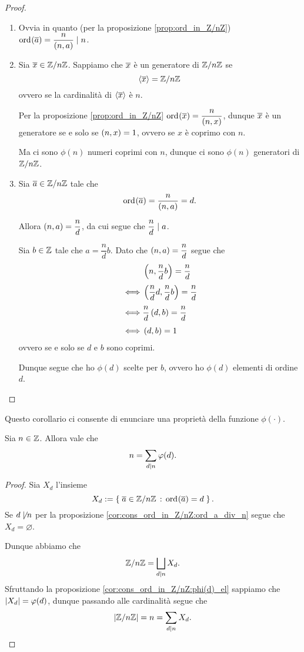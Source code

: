 \begin{proof}
    \begin{enumerate}[label={(\roman*)}]
        \item Ovvia in quanto (per la proposizione \ref{prop:ord_in_Z/nZ}) $\ord{\eqclass a} = \dfrac{n}{\mcd{n}{a}} \divides n$.
        \item Sia $\eqclass x \in \Zmod{n}$. Sappiamo che $\eqclass x$ è un generatore di $\mathbb{Z}/n\mathbb{Z}$ se \[
            \cycl*{\eqclass x} = \Zmod n    
        \] ovvero se la cardinalità di $\cycl*{\eqclass x}$ è $n$.

        Per la proposizione \ref{prop:ord_in_Z/nZ} $\ord{\eqclass x} = \dfrac{n}{\mcd{n}{x}}$, dunque $\eqclass x$ è un generatore se e solo se $\left(n, x\right) = 1$, ovvero se $x$ è coprimo con $n$.

        Ma ci sono $\phi(n)$ numeri coprimi con $n$, dunque ci sono $\phi(n)$ generatori di $\mathbb{Z}/n\mathbb{Z}$.
        \item Sia $\eqclass a \in \Zmod n$ tale che \[
            \ord{\eqclass a} = \frac{n}{\mcd{n}{a}} = d.    
        \]

        Allora $\left(n, a\right) = \dfrac{n}{d}$, da cui segue che $\dfrac{n}{d} \mid a$.

        Sia $b \in \mathbb{Z}$ tale che $a = \dfrac{n}{d}b$. Dato che $\left(n, a\right) = \dfrac{n}{d}$ segue che \begin{align*}
            &\left(n, \frac{n}{d}b\right) = \frac{n}{d}\\[3pt]
            \iff &\left(\frac{n}{d}d, \frac{n}{d}b\right) = \frac{n}{d}\\[3pt]
            \iff &\frac{n}{d}\left(d, b\right) = \frac{n}{d}\\[3pt]
            \iff &\left(d, b\right) = 1
        \end{align*}
        ovvero se e solo se $d$ e $b$ sono coprimi.

        Dunque segue che ho $\phi(d)$ scelte per $b$, ovvero ho $\phi(d)$ elementi di ordine $d$.
    \end{enumerate}
\end{proof}

Questo corollario ci consente di enunciare una proprietà della funzione $\phi(\cdot)$.

\begin{corollary}
    Sia $n \in \mathbb{Z}$. Allora vale che \[
        n = \sum_{d \mid n} \varphi(d).    
    \]
\end{corollary}
\begin{proof}
    Sia $X_d$ l'insieme \[
        X_d \deq \set{\eqclass a \in \Zmod n \suchthat \ord{\eqclass a} = d}.    
    \]
    Se $d \not\mid n$ per la proposizione \ref{cor:cons_ord_in_Z/nZ:ord_a_div_n} segue che $X_d = \varnothing$.

    Dunque abbiamo che \[
        \mathbb{Z}/n\mathbb{Z} = \bigsqcup_{d \mid n} X_d.  
    \] Sfruttando la proposizione \ref{cor:cons_ord_in_Z/nZ:phi(d)_el} sappiamo che $\lvert X_d\rvert = \varphi(d)$, dunque passando alle cardinalità segue che \[
        \lvert\mathbb{Z}/n\mathbb{Z}\rvert = n = \sum_{d \mid n} X_d.    
    \]
\end{proof}

